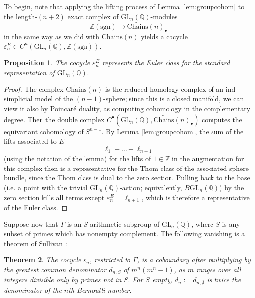 \documentclass[10pt]{amsart}
\newtheorem{thm}{Theorem}[section]
\newtheorem{prop}[thm]{Proposition}
\theoremstyle{definition}
\newcommand{\sgn}{\mathrm{sgn}}
\newcommand{\Chains}{\mathrm{Chains}}
\numberwithin{equation}{section}
\begin{document}
    To begin, note that applying the lifting process of Lemma \ref{lem:groupcohom} to the length-$(n+2)$ exact complex of $\mathrm{GL}_n(\mathbb{Q})$-modules
    \begin{equation} \label{eq:topaugchains}
    \mathbb{Z}(\sgn)\to \widetilde{\Chains}(n)_\bullet
    \end{equation}
    in the same way as we did with $\Chains(n)$ yields a cocycle $\varepsilon_n^E\in C^{n}(\mathrm{GL}_n(\mathbb{Q}), \mathbb{Z}(\sgn))$. 
    \begin{prop}
        The cocycle $\varepsilon_n^E$ represents the Euler class for the standard representation of $\mathrm{GL}_n(\mathbb{Q})$.
    \end{prop}
    \begin{proof}
        The complex $\widetilde{\Chains}(n)$ is the reduced homology complex of an ind-simplicial model of the $(n-1)$-sphere; since this is a closed manifold, we can view it also by Poincaré duality, as computing cohomology in the complementary degree. Then the double complex $C^\bullet(\mathrm{GL}_n(\mathbb{Q}), \widetilde{\Chains}(n)_\bullet)$ computes the equivariant cohomology of $S^{n-1}$. By Lemma \ref{lem:groupcohom}, the sum of the lifts associated to $E$ 
        \[\ell_1+\ldots+\ell_{n+1}\]
        (using the notation of the lemma) for the lifts of $1\in\mathbb{Z}$ in the augmentation for this complex then is a representative for the Thom class of the associated sphere bundle, since the Thom class is dual to the zero section. Pulling back to the base (i.e. a point with the trivial $\mathrm{GL}_n(\mathbb{Q})$-action; equivalently, $B\mathrm{GL}_n(\mathbb{Q})$) by the zero section kills all terms except $\varepsilon_n^E=\ell_{n+1}$, which is therefore a representative of the Euler class.
    \end{proof}

    Suppose now that $\Gamma$ is an $S$-arithmetic subgroup of $\mathrm{GL}_n(\mathbb{Q})$, where $S$ is any subset of primes which has nonempty complement. The following vanishing is a theorem of Sullivan \cite{Sul}:

    \begin{thm} \label{cor:sullivan}
        The cocycle $\varepsilon_n$, restricted to $\Gamma$, is a coboundary after multiplying by the greatest common denominator $d_{n,S}$ of $m^n(m^n-1)$, as $m$ ranges over all integers divisible only by primes not in $S$. For $S$ empty, $d_{n}:=d_{n,\emptyset}$ is twice the denominator of the $n$th Bernoulli number.
    \end{thm}
\end{document}
